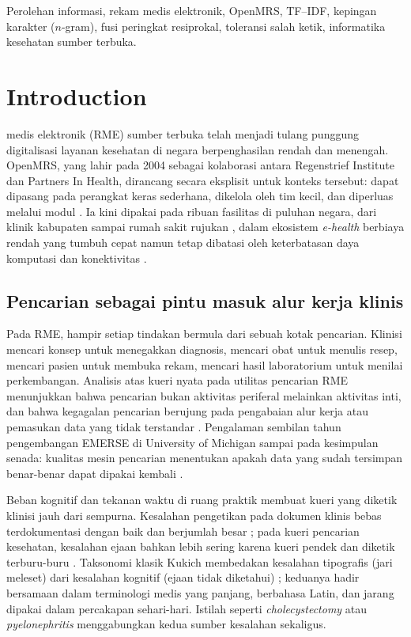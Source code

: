 \documentclass[journal,twoside,web]{ieeecolor}
\begin{document}
\begin{IEEEkeywords}
Perolehan informasi, rekam medis elektronik, OpenMRS, TF--IDF, kepingan karakter
($n$-gram), fusi peringkat resiprokal, toleransi salah ketik, informatika
kesehatan sumber terbuka.
\end{IEEEkeywords}

\section{Introduction}

 medis elektronik (RME) sumber terbuka telah menjadi
tulang punggung digitalisasi layanan kesehatan di negara berpenghasilan rendah
dan menengah. OpenMRS, yang lahir pada 2004 sebagai kolaborasi antara Regenstrief
Institute dan Partners In Health, dirancang secara eksplisit untuk konteks
tersebut: dapat dipasang pada perangkat keras sederhana, dikelola oleh tim kecil,
dan diperluas melalui modul \cite{mamlin2006, seebregts2009}. Ia kini dipakai
pada ribuan fasilitas di puluhan negara, dari klinik kabupaten sampai rumah sakit
rujukan \cite{fraser2005, muinga2018}, dalam ekosistem \emph{e-health} berbiaya
rendah yang tumbuh cepat namun tetap dibatasi oleh keterbatasan daya komputasi
dan konektivitas \cite{lewis2012}.

\subsection{Pencarian sebagai pintu masuk alur kerja klinis}

Pada RME, hampir setiap tindakan bermula dari sebuah kotak pencarian. Klinisi
mencari konsep untuk menegakkan diagnosis, mencari obat untuk menulis resep,
mencari pasien untuk membuka rekam, mencari hasil laboratorium untuk menilai
perkembangan. Analisis atas kueri nyata pada utilitas pencarian RME menunjukkan
bahwa pencarian bukan aktivitas periferal melainkan aktivitas inti, dan bahwa
kegagalan pencarian berujung pada pengabaian alur kerja atau pemasukan data yang
tidak terstandar \cite{natarajan2010}. Pengalaman sembilan tahun pengembangan
EMERSE di University of Michigan sampai pada kesimpulan senada: kualitas mesin
pencarian menentukan apakah data yang sudah tersimpan benar-benar dapat dipakai
kembali \cite{hanauer2015}.

Beban kognitif dan tekanan waktu di ruang praktik membuat kueri yang diketik
klinisi jauh dari sempurna. Kesalahan pengetikan pada dokumen klinis bebas
terdokumentasi dengan baik dan berjumlah besar \cite{lai2015}; pada kueri
pencarian kesehatan, kesalahan ejaan bahkan lebih sering karena kueri pendek dan
diketik terburu-buru \cite{crowell2004, kilicoglu2015}. Taksonomi klasik Kukich
membedakan kesalahan tipografis (jari meleset) dari kesalahan kognitif (ejaan
tidak diketahui) \cite{kukich1992}; keduanya hadir bersamaan dalam terminologi
medis yang panjang, berbahasa Latin, dan jarang dipakai dalam percakapan
sehari-hari. Istilah seperti \emph{cholecystectomy} atau \emph{pyelonephritis}
menggabungkan kedua sumber kesalahan sekaligus.
\end{document}
